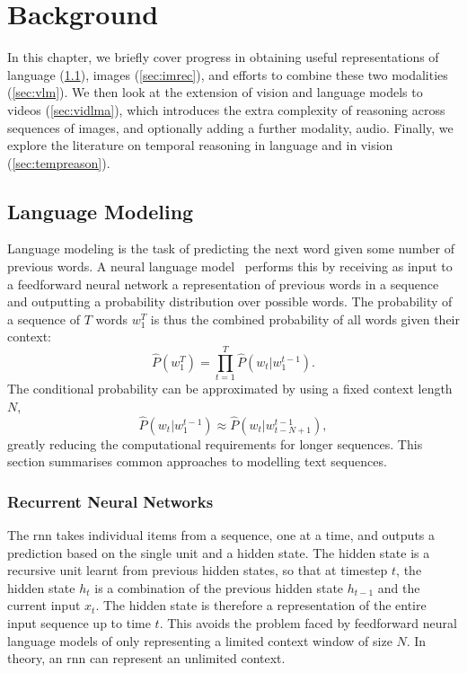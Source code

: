 
\chapter{Background}
\label{chap:bg}

In this chapter, we briefly cover progress in obtaining useful representations
of language (\cref{sec:lm}), images (\cref{sec:imrec}), and efforts to combine
these two modalities (\cref{sec:vlm}). We then look at the extension of vision
and language models to videos (\cref{sec:vidlma}), which introduces the extra
complexity of reasoning across sequences of images, and optionally adding a
further modality, audio. Finally, we explore the literature on temporal
reasoning in language and in vision (\cref{sec:tempreason}).

\section{Language Modeling}
\label{sec:lm}

Language modeling is the task of predicting the next word given some number of
previous words. A neural language model~\citep{bengio2003nlm} performs this by
receiving as input to a feedforward neural network a representation of previous
words in a sequence and outputting a probability distribution over possible
words. The probability of a sequence of $T$ words $w_1^T$ is thus the
combined probability of all words given their context:
$$\hat{P}(w_1^T)=\prod_{t=1}^{T}\hat{P}(w_t|w_1^{t-1}).$$
The conditional probability can be approximated by using a fixed context
length $N$, $$\hat{P}(w_t|w_1^{t-1})\approx\hat{P}(w_t|w_{t-N+1}^{t-1}),$$
greatly reducing the computational requirements for longer sequences. This section
summarises common approaches to modelling text sequences.

\subsection{Recurrent Neural Networks}
\label{ssec:rnn}

The \acrfull{rnn} takes individual items from a sequence, one
at a time, and outputs a prediction based on the single unit and a hidden
state.  The hidden state is a recursive unit learnt from previous hidden
states, so that at timestep $t$, the hidden state $h_t$ is a combination of the
previous hidden state $h_{t-1}$ and the current input $x_t$. The hidden state
is therefore a representation of the entire input sequence up to time $t$. This
avoids the problem faced by feedforward neural language models of only
representing a limited context window of size $N$. In theory, an \acrshort{rnn}
can represent an unlimited context.

